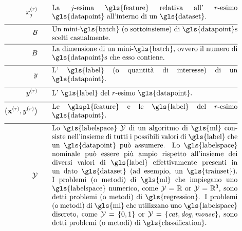 \begin{align}
	\feature_{\featureidx}^{(\sampleidx)}\quad\quad &\parbox{.75\textwidth}{La $\featureidx$-esima \gls{feature} relativa all' $\sampleidx$-esimo 
		\gls{datapoint} all'interno di un \gls{dataset}.} \nonumber \\[2mm] \hline \nonumber\\[-5mm]
	\batch \quad\quad &\parbox{.75\textwidth}{Un mini-\gls{batch} (o sottoinsieme) di \gls{datapoint}s scelti casualmente.}\nonumber \\[2mm] \hline \nonumber\\[-5mm]
	\batchsize \quad\quad &\parbox{.75\textwidth}{La dimensione di un mini-\gls{batch}, ovvero il numero di \gls{datapoint}s che esso contiene.}\nonumber \\[2mm] \hline \nonumber\\[-5mm]
	\truelabel \quad\quad &\parbox{.75\textwidth}{L' \gls{label} (o quantità di interesse) di un \gls{datapoint}.} \nonumber \\[2mm] \hline \nonumber\\[-5mm]
	\truelabel^{(\sampleidx)} \quad\quad &\parbox{.75\textwidth}{L' \gls{label} del $\sampleidx$-esimo \gls{datapoint}.} \nonumber \\[2mm] \hline \nonumber\\[-5mm]
	\big(\featurevec^{(\sampleidx)},\truelabel^{(\sampleidx)}\big)  \quad\quad &\parbox{.75\textwidth}{Le \glspl{feature} e le \gls{label} del $\sampleidx$-esimo \gls{datapoint}.}\nonumber \\[2mm] \hline \nonumber\\[-5mm]
	\labelspace  \quad\quad & \parbox{.75\textwidth}{Lo \gls{labelspace} $\labelspace$ di un algoritmo di \gls{ml} consiste nell’insieme di tutti i possibili valori di \gls{label} che un \gls{datapoint} può assumere. Lo \gls{labelspace} nominale può essere più ampio rispetto all’insieme dei diversi valori di \gls{label} effettivamente presenti in un dato \gls{dataset} (ad esempio, un \gls{trainset}). I problemi (o metodi) di \gls{ml} che impiegano uno \gls{labelspace} numerico, come $\labelspace=\mathbb{R}$ 
		or $\labelspace=\mathbb{R}^{3}$, sono detti problemi (o metodi) di \gls{regression}. I problemi (o metodi) di \gls{ml} che utilizzano uno \gls{labelspace} discreto, come $\labelspace=\{0,1\}$ or $\labelspace=\{\mbox{\emph{cat}},\mbox{\emph{dog}},\mbox{\emph{mouse}}\}$, 
		sono detti problemi (o metodi) di \gls{classification}.}  \nonumber %
\end{align}                  


